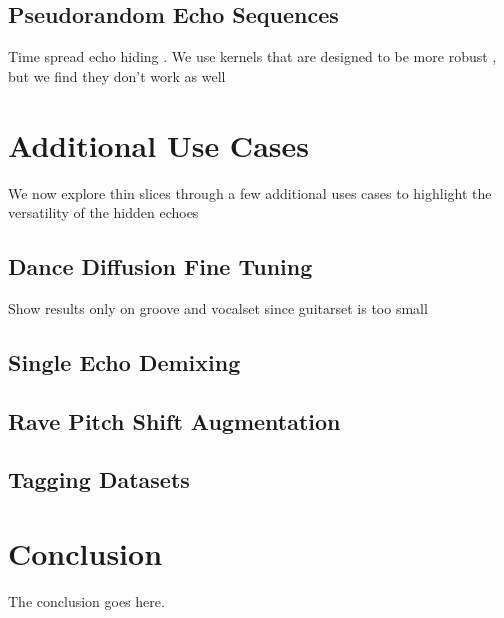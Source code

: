 \documentclass[letterpaper]{article} %
\begin{document}
\subsection{Pseudorandom Echo Sequences}

Time spread echo hiding \cite{ko2005time}.  We use kernels that are designed to be more robust \cite{xiang2010effective}, but we find they don't work as well

\section{Additional Use Cases}

We now explore thin slices through a few additional uses cases to highlight the versatility of the hidden echoes



\subsection{Dance Diffusion Fine Tuning}

Show results only on groove and vocalset since guitarset is too small


\subsection{Single Echo Demixing}



\subsection{Rave Pitch Shift Augmentation}



\subsection{Tagging Datasets}






\section{Conclusion}
The conclusion goes here.



\end{document}
